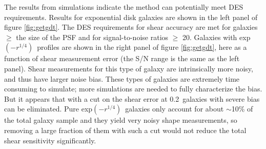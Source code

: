 \documentclass[12pt]{article}
\newcommand{\devprof}{exp$(-r^{1/4})$}
\newcommand{\errcut}{0.2}
\begin{document}
The results from simulations indicate the method can potentially meet DES
requirements.  Results for exponential disk galaxies are shown in the left
panel of figure \ref{fig:getgdt}.  The DES requirements for shear accuracy are
met for galaxies $\geq$ the size of the PSF and for signal-to-noise ratios
$\geq$ 20.  Galaxies with \devprof\ profiles are shown in the right panel of
figure \ref{fig:getgdt}, here as a function of shear measurement error (the S/N
range is the same as the left panel).  Shear measurements for this type of
galaxy are intrinsically more noisy, and thus have larger noise bias.  These
types of galaxies are extremely time consuming to simulate; more simulations
are needed to fully characterize the bias. But it appears that with a cut on
the shear error at \errcut\ galaxies with severe bias can be eliminated.  Pure
\devprof\ galaxies only account for about $\sim$10\% of the total galaxy sample
and they yield very noisy shape measurements, so removing a large fraction of
them with such a cut would not reduce the total shear sensitivity
significantly.
\end{document}
